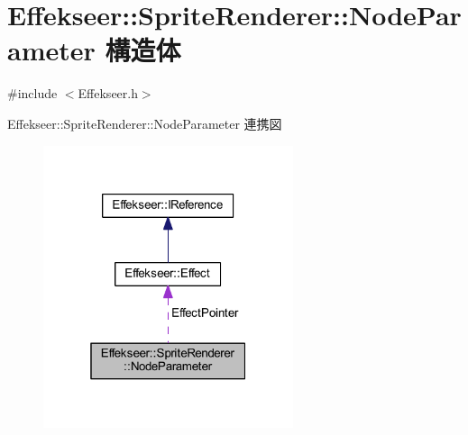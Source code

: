 \hypertarget{struct_effekseer_1_1_sprite_renderer_1_1_node_parameter}{}\section{Effekseer\+:\+:Sprite\+Renderer\+:\+:Node\+Parameter 構造体}
\label{struct_effekseer_1_1_sprite_renderer_1_1_node_parameter}


{\ttfamily \#include $<$Effekseer.\+h$>$}



Effekseer\+:\+:Sprite\+Renderer\+:\+:Node\+Parameter 連携図\nopagebreak
\begin{figure}[H]
\begin{center}
\leavevmode
\includegraphics[width=208pt]{struct_effekseer_1_1_sprite_renderer_1_1_node_parameter__coll__graph}
\end{center}
\end{figure}

